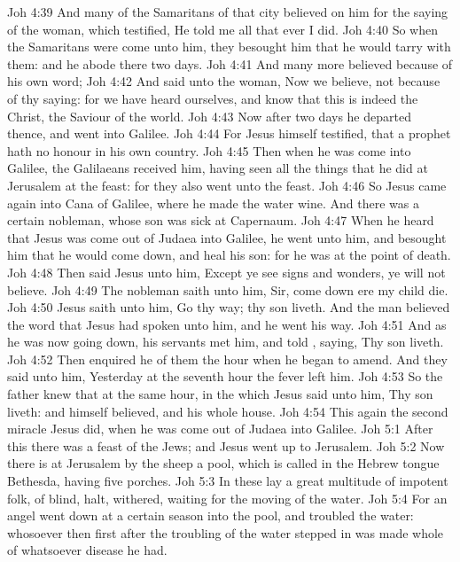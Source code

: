 \vs Joh 4:39 And many of the Samaritans of that city believed on him for the saying of the woman, which testified, He told me all that ever I did.
\vs Joh 4:40 So when the Samaritans were come unto him, they besought him that he would tarry with them: and he abode there two days.
\vs Joh 4:41 And many more believed because of his own word;
\vs Joh 4:42 And said unto the woman, Now we believe, not because of thy saying: for we have heard  ourselves, and know that this is indeed the Christ, the Saviour of the world.
\vs Joh 4:43 Now after two days he departed thence, and went into Galilee.
\vs Joh 4:44 For Jesus himself testified, that a prophet hath no honour in his own country.
\vs Joh 4:45 Then when he was come into Galilee, the Galilaeans received him, having seen all the things that he did at Jerusalem at the feast: for they also went unto the feast.
\vs Joh 4:46 So Jesus came again into Cana of Galilee, where he made the water wine. And there was a certain nobleman, whose son was sick at Capernaum.
\vs Joh 4:47 When he heard that Jesus was come out of Judaea into Galilee, he went unto him, and besought him that he would come down, and heal his son: for he was at the point of death.
\vs Joh 4:48 Then said Jesus unto him, Except ye see signs and wonders, ye will not believe.
\vs Joh 4:49 The nobleman saith unto him, Sir, come down ere my child die.
\vs Joh 4:50 Jesus saith unto him, Go thy way; thy son liveth. And the man believed the word that Jesus had spoken unto him, and he went his way.
\vs Joh 4:51 And as he was now going down, his servants met him, and told , saying, Thy son liveth.
\vs Joh 4:52 Then enquired he of them the hour when he began to amend. And they said unto him, Yesterday at the seventh hour the fever left him.
\vs Joh 4:53 So the father knew that  at the same hour, in the which Jesus said unto him, Thy son liveth: and himself believed, and his whole house.
\vs Joh 4:54 This  again the second miracle  Jesus did, when he was come out of Judaea into Galilee.
\vs Joh 5:1 After this there was a feast of the Jews; and Jesus went up to Jerusalem.
\vs Joh 5:2 Now there is at Jerusalem by the sheep  a pool, which is called in the Hebrew tongue Bethesda, having five porches.
\vs Joh 5:3 In these lay a great multitude of impotent folk, of blind, halt, withered, waiting for the moving of the water.
\vs Joh 5:4 For an angel went down at a certain season into the pool, and troubled the water: whosoever then first after the troubling of the water stepped in was made whole of whatsoever disease he had.
